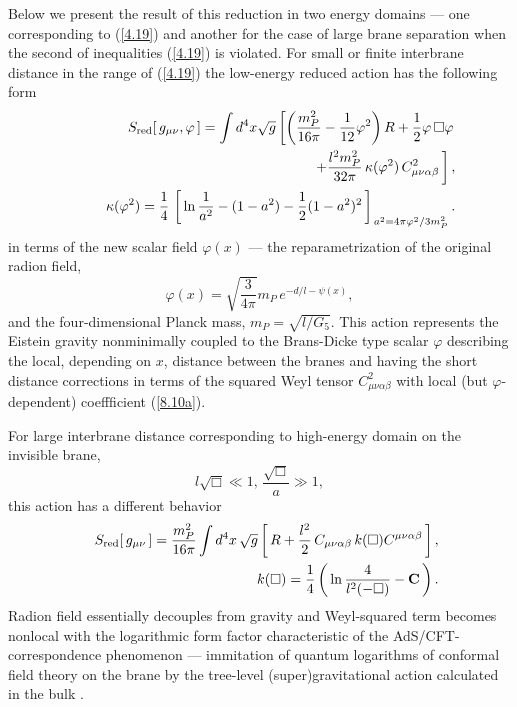 \documentclass[a4paper,12pt]{article}
\begin{document}
Below we present the result of this reduction in two energy domains
--- one corresponding to (\ref{4.19}) and another for the case of
large brane separation when the second of inequalities (\ref{4.19})
is violated. For small or finite interbrane distance in the range of
(\ref{4.19}) the low-energy reduced action has the following form
     \begin{eqnarray}
     &&S_{\rm red}[\,g_{\mu\nu},\varphi\,]=\int d^4x \sqrt{g}
     \left[\left(\frac{m_P^2}{16\pi}
     -\frac1{12} \varphi^2\right)R
     +\frac12\varphi\,\Box\varphi\right. \nonumber\\
     &&\qquad\qquad\qquad\qquad\qquad\qquad\quad\qquad\qquad
     \left.
     +\frac{l^2 m_P^2}{32\pi}\,
     \kappa(\varphi^2)\,
    C_{\mu\nu\alpha\beta}^2\,
     \right],                           \label{5.1}\\
     &&\kappa(\varphi^2)=\frac14\,
    \left[\,\ln\frac1{a^2}-(1-a^2)-
      \frac12 (1-a^2)^2\,
      \right]_{\,a^2=4\pi\varphi^2/3m_P^2}.       \label{8.10a}
     \end{eqnarray}
in terms of the new scalar field $\varphi(x)$ --- the reparametrization of
the original radion field,
    \begin{equation}
    \varphi(x)=\sqrt{\frac3{4\pi}}m_P\,e^{-d/l-\psi(x)},
    \end{equation}
and the four-dimensional Planck mass, $m_P=\sqrt{l/G_5}$. This action
represents the Eistein gravity nonminimally coupled to the Brans-Dicke type
scalar $\varphi$ describing the local, depending on $x$, distance between
the branes and having the short distance corrections in terms of
the squared Weyl tensor $C_{\mu\nu\alpha\beta}^2$ with local
(but $\varphi$-dependent) coeffficient (\ref{8.10a}).

For large interbrane distance corresponding to high-energy domain
on the invisible brane,
      \begin{equation}
      l\sqrt\Box\ll 1,\,\frac{\sqrt\Box}a\gg1,
      \end{equation}
this action has a different behavior
    \begin{eqnarray}
    &&S_{\rm red}[\,g_{\mu\nu}\,]
    =\frac{m_P^2}{16\pi}\int d^4x\,\sqrt{g}
    \left[\,R+\frac{l^2}2\,
      C_{\mu\nu\alpha\beta}\,k(\Box)
      C^{\mu\nu\alpha\beta}\,\right], \label{8.24}\\
    &&k(\Box)=
    \frac14\left(\,\ln\frac4{l^2(-\Box)}
    -{\bf C}\,\right).                    \label{8.26}
    \end{eqnarray}
Radion field essentially decouples from gravity and Weyl-squared term
becomes nonlocal with the logarithmic form factor characteristic of
the AdS/CFT-correspondence phenomenon --- immitation of quantum
logarithms of conformal field theory on the brane by the tree-level
(super)gravitational action calculated in the bulk
\cite{Gubser,GKR,HHR1}.
\end{document}
